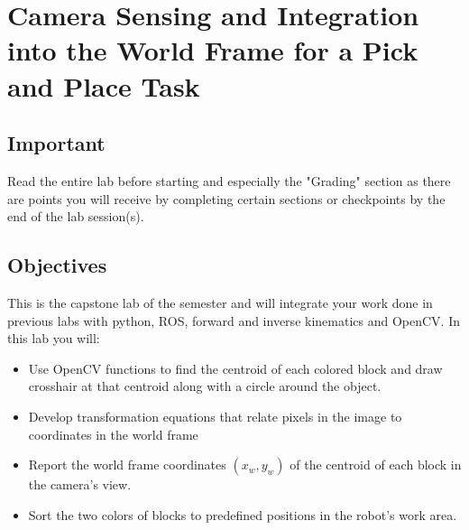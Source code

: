\chapter{Camera Sensing and Integration into the World Frame for a Pick and Place Task}

\section{Important}
Read the entire lab before starting and especially the "Grading" section as there are points you will receive by completing certain sections or checkpoints
by the end of the lab session(s). 
\section{Objectives}
This is the capstone lab of the semester and will integrate your work done in previous labs with python, ROS, forward and inverse kinematics and OpenCV.  In this lab you will:
\begin{itemize}
	\item Use OpenCV functions to find the centroid of each colored block and draw crosshair at that centroid along with a circle around the object.
	\item Develop transformation equations that relate pixels in the image to coordinates in the world frame
	\item Report the world frame coordinates $(x_w,y_w)$ of the centroid of each block in the camera’s view.
	\item Sort the two colors of blocks to predefined positions in the robot's work area.
\end{itemize}

